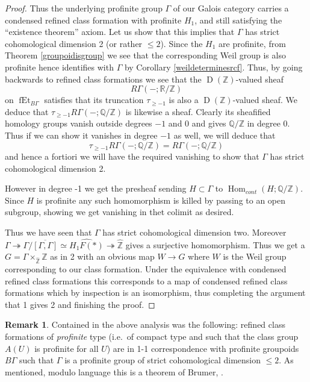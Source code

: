 \documentclass[12pt]{article}
\theoremstyle{definition}
\newtheorem{remark}[theorem]{Remark}
\newcommand{\on}{\operatorname}
\newcommand{\mbb}{\mathbb}
\newcommand{\wh}{\widehat}
\begin{document}
\begin{proof}
Thus the underlying profinite group $\Gamma$ of our Galois category carries a condensed refined class formation with profinite $H_1$, and still satisfying the ``existence theorem'' axiom.  Let us show that this implies that $\Gamma$ has strict cohomological dimension 2 (or rather $\leq 2$).  Since the $H_1$ are profinite, from Theorem \ref{groupoidisgroup} we see that the corresponding Weil group is also profinite hence identifies with $\Gamma$ by Corollary \ref{weildeterminesrcf}.  Thus, by going backwards to refined class formations we see that the $\on{D}(\mbb{Z})$-valued sheaf
$$R\Gamma(-;\mbb{R}/\mbb{Z})$$
on $\on{fEt}_{B\Gamma}$ satisfies that its truncation $\tau_{\geq -1}$ is also a $\on{D}(\mbb{Z})$-valued sheaf.  We deduce that $\tau_{\geq -1}R\Gamma(-;\mbb{Q}/\mbb{Z})$ is likewise a sheaf.  Clearly its sheafified homology groups vanish outside degrees $-1$ and $0$ and gives $\mbb{Q}/\mbb{Z}$ in degree $0$.  Thus if we can show it vanishes in degree $-1$ as well, we will deduce that
$$\tau_{\geq -1}R\Gamma(-;\mbb{Q}/\mbb{Z}) = R\Gamma(-;\mbb{Q}/\mbb{Z})$$
and hence a fortiori we will have the required vanishing to show that $\Gamma$ has strict cohomological dimension 2.

However in degree -1 we get the presheaf sending $H\subset \Gamma$ to $\on{Hom}_{cont}(H;\mbb{Q}/\mbb{Z})$.  Since $H$ is profinite any such homomorphism is killed by passing to an open subgroup, showing we get vanishing in thet colimit as desired.

Thus we have seen that $\Gamma$ has strict cohomological dimension two.  Moreover $\Gamma\twoheadrightarrow \Gamma/\overline{[\Gamma,\Gamma]}\simeq \wh{H_1F(\ast)}\twoheadrightarrow \wh{\mbb{Z}}$ gives a surjective homomorphism.  Thus we get a $G=\Gamma\times_{\wh{\mbb{Z}}}\mbb{Z}$ as in 2 with an obvious map $W\to G$ where $W$ is the Weil group corresponding to our class formation.  Under the equivalence with condensed refined class formations this corresponds to a map of condensed refined class formations which by inspection is an isomorphism, thus completing the argument that 1 gives 2 and finishing the proof.
\end{proof}

\begin{remark}
Contained in the above analysis was the following: refined class formations of \emph{profinite} type (i.e.\ of compact type and such that the class group $A(U)$ is profinite for all $U$) are in 1-1 correspondence with profinite groupoids $B\Gamma$ such that $\Gamma$ is a profinite group of strict cohomological dimension $\leq 2$.  As mentioned, modulo language this is a theorem of Brumer, \cite{brumer}.
\end{remark}
\end{document}
